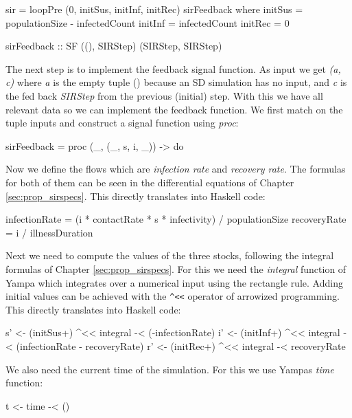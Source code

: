 \begin{HaskellCode}
sir = loopPre (0, initSus, initInf, initRec) sirFeedback
  where
    initSus = populationSize - infectedCount
    initInf = infectedCount
    initRec = 0
  
    sirFeedback :: SF ((), SIRStep) (SIRStep, SIRStep)
\end{HaskellCode}

The next step is to implement the feedback signal function. As input we get \textit{(a, c)} where \textit{a} is the empty tuple () because an SD simulation has no input, and \textit{c} is the fed back \textit{SIRStep} from the previous (initial) step. With this we have all relevant data so we can implement the feedback function. We first match on the tuple inputs and construct a signal function using \textit{proc}:

\begin{HaskellCode}
    sirFeedback = proc (_, (_, s, i, _)) -> do
\end{HaskellCode}

Now we define the flows which are \textit{infection rate} and \textit{recovery rate}. The formulas for both of them can be seen in the differential equations of Chapter \ref{sec:prop_sirspecs}. This directly translates into Haskell code:

\begin{HaskellCode}
infectionRate = (i * contactRate * s * infectivity) / populationSize
recoveryRate  = i / illnessDuration
\end{HaskellCode}

Next we need to compute the values of the three stocks, following the integral formulas of Chapter \ref{sec:prop_sirspecs}. For this we need the \textit{integral} function of Yampa which integrates over a numerical input using the rectangle rule. Adding initial values can be achieved with the \texttt{\string^<<} operator of arrowized programming. This directly translates into Haskell code:

\begin{HaskellCode}
s' <- (initSus+) ^<< integral -< (-infectionRate)
i' <- (initInf+) ^<< integral -< (infectionRate - recoveryRate)
r' <- (initRec+) ^<< integral -< recoveryRate
\end{HaskellCode}

We also need the current time of the simulation. For this we use Yampas \textit{time} function:

\begin{HaskellCode}
      t <- time -< ()
\end{HaskellCode}

